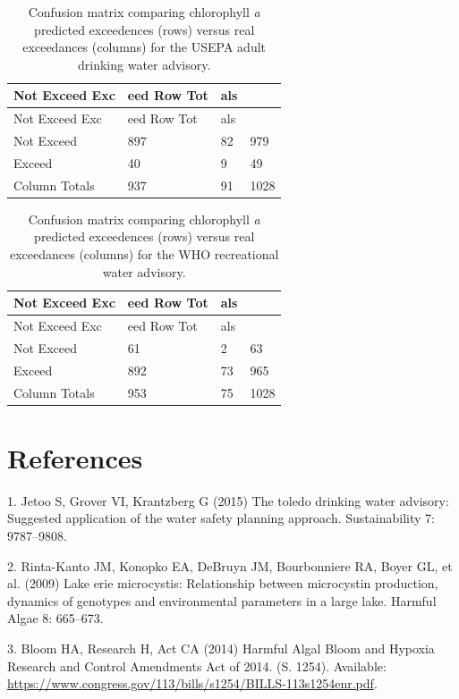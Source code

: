 \documentclass[11pt,]{article}
\begin{document}
\newpage

\begin{longtable}[c]{@{}llll@{}}
\caption{Confusion matrix comparing chlorophyll \textit{a} predicted
exceedences (rows) versus real exceedances (columns) for the USEPA adult
drinking water advisory. \label{tab:adult_conmat_table}}\tabularnewline
\toprule
Not Exceed Exc & eed Row Tot & als &\tabularnewline
\midrule
\endfirsthead
\toprule
Not Exceed Exc & eed Row Tot & als &\tabularnewline
\midrule
\endhead
Not Exceed & 897 & 82 & 979\tabularnewline
Exceed & 40 & 9 & 49\tabularnewline
Column Totals & 937 & 91 & 1028\tabularnewline
\bottomrule
\end{longtable}

\newpage

\begin{longtable}[c]{@{}llll@{}}
\caption{Confusion matrix comparing chlorophyll \textit{a} predicted
exceedences (rows) versus real exceedances (columns) for the WHO
recreational water advisory.
\label{tab:who_rec_conmat_table}}\tabularnewline
\toprule
Not Exceed Exc & eed Row Tot & als &\tabularnewline
\midrule
\endfirsthead
\toprule
Not Exceed Exc & eed Row Tot & als &\tabularnewline
\midrule
\endhead
Not Exceed & 61 & 2 & 63\tabularnewline
Exceed & 892 & 73 & 965\tabularnewline
Column Totals & 953 & 75 & 1028\tabularnewline
\bottomrule
\end{longtable}

\newpage

\section*{References}\label{references}

\hypertarget{refs}{}
\hypertarget{ref-jetoo2015toledo}{}
1. Jetoo S, Grover VI, Krantzberg G (2015) The toledo drinking water
advisory: Suggested application of the water safety planning approach.
Sustainability 7: 9787--9808.

\hypertarget{ref-rinta2009lake}{}
2. Rinta-Kanto JM, Konopko EA, DeBruyn JM, Bourbonniere RA, Boyer GL, et
al. (2009) Lake erie microcystis: Relationship between microcystin
production, dynamics of genotypes and environmental parameters in a
large lake. Harmful Algae 8: 665--673.

\hypertarget{ref-HABHRCA2014}{}
3. Bloom HA, Research H, Act CA (2014) Harmful Algal Bloom and Hypoxia
Research and Control Amendments Act of 2014. (S. 1254). Available:
\url{https://www.congress.gov/113/bills/s1254/BILLS-113s1254enr.pdf}.
\end{document}
